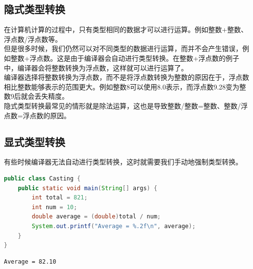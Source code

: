 \vspace{0.5cm}

\subsection{隐式类型转换}

在计算机计算的过程中，只有类型相同的数据才可以进行运算。例如整数+整数、浮点数/浮点数等。\\

但是很多时候，我们仍然可以对不同类型的数据进行运算，而并不会产生错误，例如整数+浮点数。这是由于编译器会自动进行类型转换。在整数+浮点数的例子中，编译器会将整数转换为浮点数，这样就可以进行运算了。\\

编译器选择将整数转换为浮点数，而不是将浮点数转换为整数的原因在于，浮点数相比整数能够表示的范围更大。例如整数8可以使用8.0表示，而浮点数9.28变为整数9后就会丢失精度。\\

隐式类型转换最常见的情形就是除法运算，这也是导致整数/整数=整数、整数/浮点数=浮点数的原因。\\

\subsection{显式类型转换}

有些时候编译器无法自动进行类型转换，这时就需要我们手动地强制类型转换。\\


\begin{lstlisting}[language=Java]
public class Casting {
	public static void main(String[] args) {
		int total = 821;
		int num = 10;
		double average = (double)total / num;
		System.out.printf("Average = %.2f\n", average);
	}
}
\end{lstlisting}

\begin{tcolorbox}
	\begin{verbatim}
Average = 82.10
	\end{verbatim}
\end{tcolorbox}

\newpage